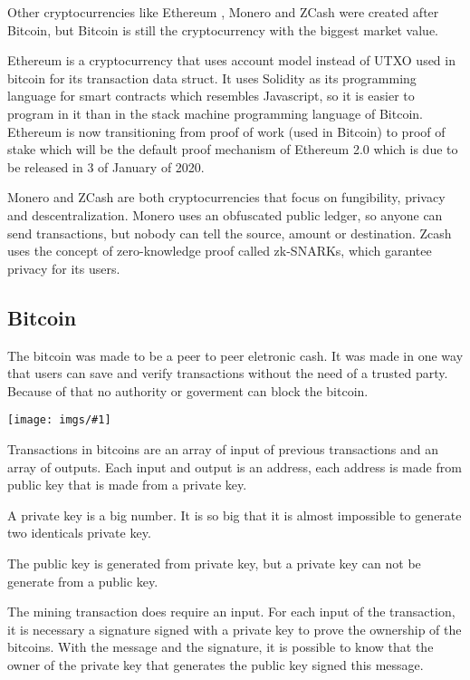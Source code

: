 \documentclass[12pt]{article}
\newcommand{\incimg}[1]{\texttt{[image: imgs/\#1]}}
\begin{document}
Other cryptocurrencies like Ethereum \cite{wood2014ethereum}, Monero \cite{noether2015ring} and
ZCash \cite{hopwood2016zcash} were created after Bitcoin,
but Bitcoin is still the cryptocurrency with the biggest market value.

Ethereum is a cryptocurrency that uses account model instead of UTXO used in bitcoin for its
transaction data struct.
It uses Solidity as its programming language for smart contracts which resembles Javascript,
so it is easier to program in it than in the stack machine programming language of Bitcoin.
Ethereum is now transitioning from proof of work (used in Bitcoin) to proof of stake
which will be the default proof mechanism of Ethereum 2.0 which is due to be released in
3 of January of 2020.

Monero and ZCash are both cryptocurrencies that focus on fungibility, privacy and descentralization.
Monero uses an obfuscated public ledger, so anyone can send transactions,
but nobody can tell the source, amount or destination.
Zcash uses the concept of zero-knowledge proof called zk-SNARKs, which garantee privacy for its users.

\subsection{Bitcoin}

The bitcoin was made to be a peer to peer eletronic cash.
It was made in one way that users can save and verify transactions without the need of a trusted party.
Because of that no authority or goverment can block the bitcoin.

\incimg{transactions1.png}

Transactions in bitcoins are an array of input of previous transactions and an array of outputs.
Each input and output is an address, each address is made from public key that is made from a private key.

A private key is a big number.
It is so big that it is almost impossible to generate two identicals private key.

The public key is generated from private key,
but a private key can not be generate from a public key.

The mining transaction does require an input.
For each input of the transaction, it is necessary a signature signed with a private key to prove the
ownership of the bitcoins.
With the message and the signature, it is possible to know that the owner of the private key
that generates the public key signed this message.
\end{document}
